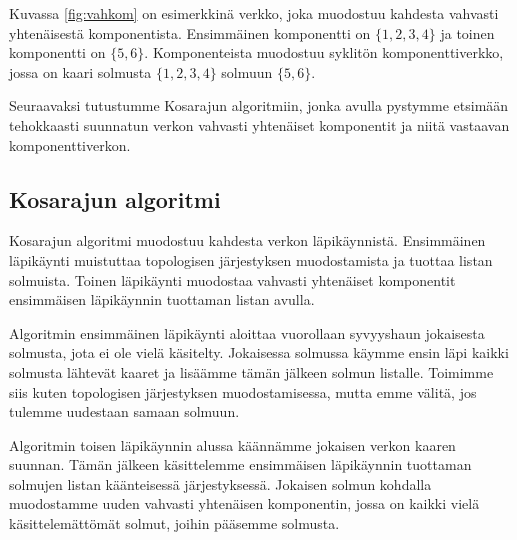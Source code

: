 Kuvassa \ref{fig:vahkom} on esimerkkinä verkko, joka muodostuu
kahdesta vahvasti yhtenäisestä komponentista.
Ensimmäinen komponentti on $\{1,2,3,4\}$
ja toinen komponentti on $\{5,6\}$.
Komponenteista muodostuu syklitön komponenttiverkko,
jossa on kaari solmusta $\{1,2,3,4\}$ solmuun $\{5,6\}$.

Seuraavaksi tutustumme Kosarajun algoritmiin,
jonka avulla pystymme etsimään tehokkaasti suunnatun
verkon vahvasti yhtenäiset komponentit ja niitä
vastaavan komponenttiverkon.

\subsection{Kosarajun algoritmi}

Kosarajun algoritmi muodostuu kahdesta verkon läpikäynnistä.
Ensimmäinen läpikäynti muistuttaa topologisen järjestyksen
muodostamista ja tuottaa listan solmuista.
Toinen läpikäynti muodostaa vahvasti yhtenäiset komponentit
ensimmäisen läpikäynnin tuottaman listan avulla.

Algoritmin ensimmäinen läpikäynti aloittaa vuorollaan
syvyyshaun jokaisesta solmusta, jota ei ole vielä käsitelty.
Jokaisessa solmussa käymme ensin läpi kaikki
solmusta lähtevät kaaret ja lisäämme tämän jälkeen solmun listalle.
Toimimme siis kuten topologisen järjestyksen muodostamisessa,
mutta emme välitä, jos tulemme uudestaan samaan solmuun.

Algoritmin toisen läpikäynnin alussa
käännämme jokaisen verkon kaaren suunnan.
Tämän jälkeen käsittelemme ensimmäisen läpikäynnin tuottaman
solmujen listan kääntei\-sessä järjestyksessä.
Jokaisen solmun kohdalla muodostamme uuden vahvasti yhtenäisen
komponentin, jossa on kaikki vielä käsittelemät\-tömät solmut,
joihin pääsemme solmusta.

